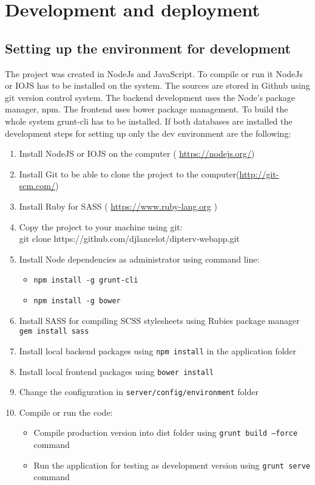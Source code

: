 \appendix
\chapter{Development and deployment}
\section*{Setting up the environment for development}
The project was created in NodeJs and JavaScript. To compile or run it NodeJs or IOJS has to be installed on the system. The sources are stored in Github using git version control system. The backend development uses the Node's package manager, npm. The frontend uses bower package management. To build the whole system grunt-cli has to be installed. If both databases are installed the development steps for setting up only the dev environment are the following:
\begin{enumerate}
\item Install NodeJS or IOJS on the computer ( \url{https://nodejs.org/})
\item Install Git to be able to clone the project to the computer(\url{http://git-scm.com/})
\item Install Ruby for SASS ( \url{https://www.ruby-lang.org} )
\item Copy the project to your machine using git: \\
git clone https://github.com/djlancelot/dipterv-webapp.git
\item Install Node dependencies as administrator using command line: 
\begin{itemize}
\item \texttt{npm install -g grunt-cli}
\item \texttt{npm install -g bower}
\end{itemize}
\item Install SASS for compiling SCSS stylesheets using Rubies package manager \texttt{gem install sass}
\item Install local backend packages using \texttt{npm install} in the application folder
\item Install local frontend packages using \texttt{bower install}
\item Change the configuration in \texttt{server/config/environment} folder
\item Compile or run the code:
\begin{itemize}
\item Compile production version into dist folder using \texttt{grunt build --force} command
\item Run the application for testing as development version using \texttt{grunt serve} command
\end{itemize}
\end{enumerate}

